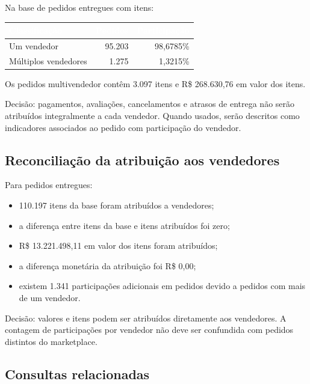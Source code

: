 \documentclass[12pt,a4paper]{article}
\newcounter{none}
\newcommand{\CabecalhoTabela}[1]{\textcolor{white}{\textbf{#1}}}
\providecommand{\tightlist}{
  \setlength{\itemsep}{0pt}\setlength{\parskip}{0pt}
}
\begin{document}
Na base de pedidos entregues com itens:

{\def\LTcaptype{none} %
\begin{longtable}[]{@{}lrr@{}}
\toprule\noalign{}
\rowcolor{AzulCorporativo}
\CabecalhoTabela{Classificação} & \CabecalhoTabela{Pedidos} & \CabecalhoTabela{Participação} \\
\midrule\noalign{}
\endhead
\bottomrule\noalign{}
\endlastfoot
Um vendedor & 95.203 & 98,6785\% \\
Múltiplos vendedores & 1.275 & 1,3215\% \\
\end{longtable}
}

Os pedidos multivendedor contêm 3.097 itens e R\$ 268.630,76 em valor
dos itens.

Decisão: pagamentos, avaliações, cancelamentos e atrasos de entrega não
serão atribuídos integralmente a cada vendedor. Quando usados, serão
descritos como indicadores associados ao pedido com participação do
vendedor.

\subsection{Reconciliação da atribuição aos
vendedores}\label{docs__analytics__evidencias_consultas_basicas_core.md__reconciliauxe7uxe3o-da-atribuiuxe7uxe3o-aos-vendedores}

Para pedidos entregues:

\begin{itemize}
\tightlist
\item
  110.197 itens da base foram atribuídos a vendedores;
\item
  a diferença entre itens da base e itens atribuídos foi zero;
\item
  R\$ 13.221.498,11 em valor dos itens foram atribuídos;
\item
  a diferença monetária da atribuição foi R\$ 0,00;
\item
  existem 1.341 participações adicionais em pedidos devido a pedidos com
  mais de um vendedor.
\end{itemize}

Decisão: valores e itens podem ser atribuídos diretamente aos
vendedores. A contagem de participações por vendedor não deve ser
confundida com pedidos distintos do marketplace.

\subsection{Consultas
relacionadas}\label{docs__analytics__evidencias_consultas_basicas_core.md__consultas-relacionadas}
\end{document}
